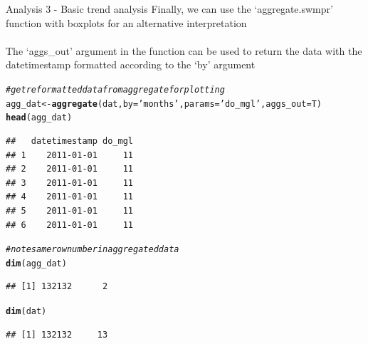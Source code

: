 \documentclass[xcolor=svgnames]{beamer}\usepackage[]{graphicx}\usepackage[]{color}
\makeatletter
\newcommand{\hlstr}[1]{\textcolor[rgb]{0.192,0.494,0.8}{#1}}%
\newcommand{\hlcom}[1]{\textcolor[rgb]{0.678,0.584,0.686}{\textit{#1}}}%
\newcommand{\hlstd}[1]{\textcolor[rgb]{0.345,0.345,0.345}{#1}}%
\newcommand{\hlkwb}[1]{\textcolor[rgb]{0.69,0.353,0.396}{#1}}%
\newcommand{\hlkwc}[1]{\textcolor[rgb]{0.333,0.667,0.333}{#1}}%
\newcommand{\hlkwd}[1]{\textcolor[rgb]{0.737,0.353,0.396}{\textbf{#1}}}%
\newenvironment{kframe}{%
 \def\at@end@of@kframe{}%
 \ifinner\ifhmode%
  \def\at@end@of@kframe{\end{minipage}}%
  \begin{minipage}{\columnwidth}%
 \fi\fi%
 \def\FrameCommand##1{\hskip\@totalleftmargin \hskip-\fboxsep
 \colorbox{shadecolor}{##1}\hskip-\fboxsep
     \hskip-\linewidth \hskip-\@totalleftmargin \hskip\columnwidth}%
 \MakeFramed {\advance\hsize-\width
   \@totalleftmargin\z@ \linewidth\hsize
   \@setminipage}}%
 {\par\unskip\endMakeFramed%
 \at@end@of@kframe}
\newenvironment{knitrout}{}{} %
\makeatother
\begin{document}
\begin{frame}[containsverbatim]{Analysis 3 - Basic trend analysis}
Finally, we can use the `aggregate.swmpr' function with boxplots for an alternative interpretation \\~\\
The `aggs\_out' argument in the function can be used to return the data with the datetimestamp formatted according to the `by' argument
\begin{knitrout}\scriptsize
{}\color{fgcolor}\begin{kframe}
\begin{alltt}
\hlcom{# get reformatted data from aggregate for plotting}
\hlstd{agg_dat} \hlkwb{<-} \hlkwd{aggregate}\hlstd{(dat,} \hlkwc{by} \hlstd{=} \hlstr{'months'}\hlstd{,} \hlkwc{params} \hlstd{=} \hlstr{'do_mgl'}\hlstd{,} \hlkwc{aggs_out} \hlstd{= T)}
\hlkwd{head}\hlstd{(agg_dat)}
\end{alltt}
\begin{verbatim}
##   datetimestamp do_mgl
## 1    2011-01-01     11
## 2    2011-01-01     11
## 3    2011-01-01     11
## 4    2011-01-01     11
## 5    2011-01-01     11
## 6    2011-01-01     11
\end{verbatim}
\begin{alltt}
\hlcom{# note same row number in aggregated data}
\hlkwd{dim}\hlstd{(agg_dat)}
\end{alltt}
\begin{verbatim}
## [1] 132132      2
\end{verbatim}
\begin{alltt}
\hlkwd{dim}\hlstd{(dat)}
\end{alltt}
\begin{verbatim}
## [1] 132132     13
\end{verbatim}
\end{kframe}
\end{knitrout}
\end{frame}
\end{document}
